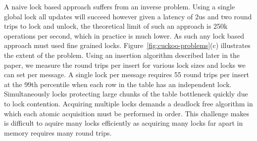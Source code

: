 A naive lock based approach suffers from an inverse problem.
Using a single global lock all updates will succeed however
given a latency of 2us and two round trips to lock and
unlock, the theoretical limit of such an approach is 250k
operations per second, which in practice is much lower. As
such any lock based approach must used fine grained locks.
Figure~\ref{fig:cuckoo-problems}(c) illustrates the extent
of the problem. Using an insertion algorithm described later
in the paper, we measure the round trips per insert for
various lock sizes and locks we can set per message. A
single lock per message requires 55 round trips per insert
at the 99th percentile when each row in the table has an
independent lock. Simultaneously locks protecting large
chunks of the table bottleneck quickly due to lock
contention.  Acquiring multiple locks demands a deadlock
free algorithm in which each atomic acquisition must be
performed in order.  This challenge makes is difficult to
aquire many locks efficiently as acquiring many locks far
apart in memory requires many round trips.



